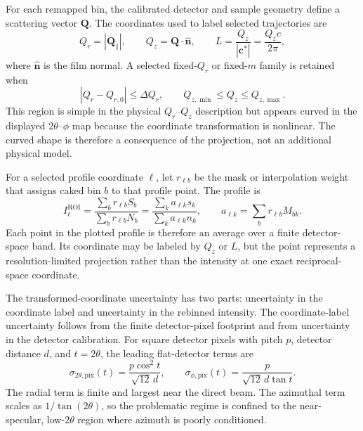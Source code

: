 \documentclass[11pt]{article}
\begin{document}
For each remapped bin, the calibrated detector and sample geometry define a scattering vector $\mathbf Q$. The coordinates used to label selected trajectories are
\begin{equation}
Q_r=|\mathbf Q_{\parallel}|,
\qquad
Q_z=\mathbf Q\cdot \hat{\mathbf n},
\qquad
L=\frac{Q_z}{|\mathbf c^{*}|}=\frac{Q_z c}{2\pi},
\end{equation}
where $\hat{\mathbf n}$ is the film normal. A selected fixed-$Q_r$ or fixed-$m$ family is retained when
\begin{equation}
|Q_r-Q_{r,0}|\le \Delta Q_r,
\qquad
Q_{z,\min}\le Q_z\le Q_{z,\max}.
\end{equation}
This region is simple in the physical $Q_r$--$Q_z$ description but appears curved in the displayed $2\theta$--$\phi$ map because the coordinate transformation is nonlinear. The curved shape is therefore a consequence of the projection, not an additional physical model.

For a selected profile coordinate $\ell$, let $r_{\ell b}$ be the mask or interpolation weight that assigns caked bin $b$ to that profile point. The profile is
\begin{equation}
I_{\ell}^{\mathrm{ROI}}=
\frac{\sum_b r_{\ell b}S_b}
     {\sum_b r_{\ell b}N_b}
=
\frac{\sum_k a_{\ell k}s_k}
     {\sum_k a_{\ell k}n_k},
\qquad
 a_{\ell k}=\sum_b r_{\ell b}M_{bk}.
\end{equation}
Each point in the plotted profile is therefore an average over a finite detector-space band. Its coordinate may be labeled by $Q_z$ or $L$, but the point represents a resolution-limited projection rather than the intensity at one exact reciprocal-space coordinate.

The transformed-coordinate uncertainty has two parts: uncertainty in the coordinate label and uncertainty in the rebinned intensity. The coordinate-label uncertainty follows from the finite detector-pixel footprint and from uncertainty in the detector calibration. For square detector pixels with pitch $p$, detector distance $d$, and $t=2\theta$, the leading flat-detector terms are
\begin{equation}
\sigma_{2\theta,\mathrm{pix}}(t)=
\frac{p\cos^{2}t}{\sqrt{12}\,d},
\qquad
\sigma_{\phi,\mathrm{pix}}(t)=
\frac{p}{\sqrt{12}\,d\tan t}.
\end{equation}
The radial term is finite and largest near the direct beam. The azimuthal term scales as $1/\tan(2\theta)$, so the problematic regime is confined to the near-specular, low-$2\theta$ region where azimuth is poorly conditioned.
\end{document}
